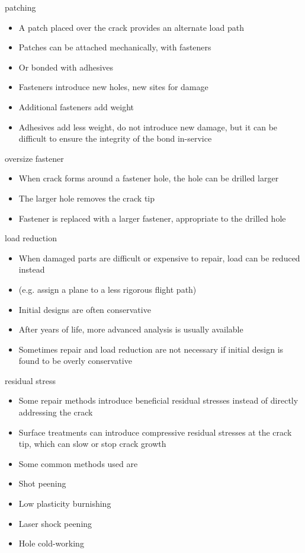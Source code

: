 \documentclass[10pt]{beamer}
\begin{document}
	\begin{frame}{patching}
		\begin{itemize}[<+->]
			\item A patch placed over the crack provides an alternate load path
			\item Patches can be attached mechanically, with fasteners
			\item Or bonded with adhesives
			\item Fasteners introduce new holes, new sites for damage
			\item Additional fasteners add weight
			\item Adhesives add less weight, do not introduce new damage, but it can be difficult to ensure the integrity of the bond in-service
		\end{itemize}
	\end{frame}
	
	\begin{frame}{oversize fastener}
		\begin{itemize}[<+->]
			\item When crack forms around a fastener hole, the hole can be drilled larger
			\item The larger hole removes the crack tip
			\item Fastener is replaced with a larger fastener, appropriate to the drilled hole
		\end{itemize}
	\end{frame}
	
	\begin{frame}{load reduction}
		\begin{itemize}[<+->]
			\item When damaged parts are difficult or expensive to repair, load can be reduced instead
			\item (e.g. assign a plane to a less rigorous flight path)
			\item Initial designs are often conservative
			\item After years of life, more advanced analysis is usually available
			\item Sometimes repair and load reduction are not necessary if initial design is found to be overly conservative
		\end{itemize}
	\end{frame}
	
	\begin{frame}{residual stress}
		\begin{itemize}[<+->]
			\item Some repair methods introduce beneficial residual stresses instead of directly addressing the crack
			\item Surface treatments can introduce compressive residual stresses at the crack tip, which can slow or stop crack growth
			\item Some common methods used are
			\item Shot peening
			\item Low plasticity burnishing
			\item Laser shock peening
			\item Hole cold-working
		\end{itemize}
	\end{frame}
	
\end{document}
